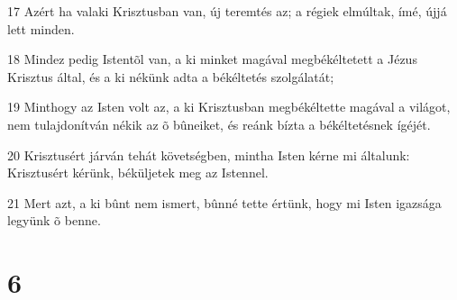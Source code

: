 \par 17 Azért ha valaki Krisztusban van, új teremtés az; a régiek  elmúltak, ímé, újjá lett minden.
\par 18 Mindez pedig Istentõl van, a ki minket magával megbékéltetett a Jézus Krisztus által, és a ki nékünk adta a békéltetés szolgálatát;
\par 19 Minthogy az Isten volt az, a ki Krisztusban megbékéltette magával a világot, nem tulajdonítván nékik az õ bûneiket, és reánk bízta a békéltetésnek ígéjét.
\par 20 Krisztusért járván tehát követségben, mintha Isten kérne mi általunk: Krisztusért kérünk, béküljetek meg az Istennel.
\par 21 Mert azt, a ki bûnt nem ismert, bûnné tette  értünk, hogy mi Isten igazsága legyünk õ benne.

\chapter{6}

